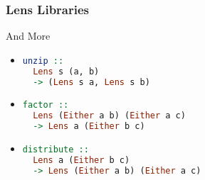 \begin{frame}[fragile]
\frametitle{Lens Libraries}

\begin{block}{And More}
\begin{itemize}
\item \begin{lstlisting}[language=haskell]
unzip ::
  Lens s (a, b)
  -> (Lens s a, Lens s b)
\end{lstlisting}

\item \begin{lstlisting}[language=haskell]
factor ::
  Lens (Either a b) (Either a c)
  -> Lens a (Either b c)
\end{lstlisting}

\item \begin{lstlisting}[language=haskell]
distribute ::
  Lens a (Either b c)
  -> Lens (Either a b) (Either a c)
\end{lstlisting}
\end{itemize}
\end{block}

\end{frame}


